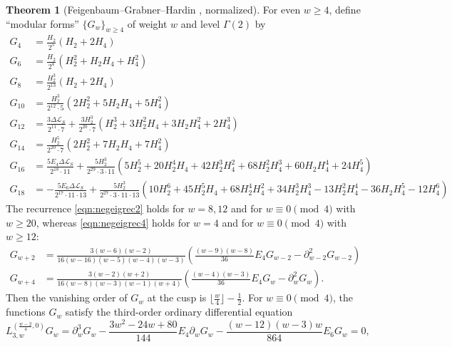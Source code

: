 \documentclass[10pt,reqno]{amsproc}
\newcommand{\cL}{\mathcal{L}}
\newcommand{\1}{\mathds{1}}	%
\theoremstyle{definition}
\newtheorem{theorem}{Theorem}[section]
\theoremstyle{remark}
\begin{document}
\begin{theorem}[Feigenbaum--Grabner--Hardin \cite{feigenbaum2021eigenfunctions}, normalized]
\label{thm:fghnegeig} 
For even $w \geq 4$, define ``modular forms'' $\{G_w\}_{w \geq 4}$ of weight $w$ and level $\Gamma(2)$ by
\begin{align*}
    G_{4} &= \frac{H_2}{2^5} (H_2 + 2H_4) \\
    G_{6} &= \frac{H_2}{2^4} (H_2^2 + H_2 H_4 + H_4^2) \\
    G_{8} &= \frac{H_{2}^{3}}{2^{13}}(H_{2} + 2H_{4})\\
    G_{10} &= \frac{H_{2}^{3}}{2^{12} \cdot 5}(2H_{2}^{2} + 5 H_{2} H_{4}+ 5H_{4}^{2}) \\
    G_{12} &= \frac{3 \Delta \cL_S}{2^{11} \cdot 7} + \frac{3H_{2}^{3}}{2^{20} \cdot 7}(H_{2}^{3} + 3 H_{2}^{2}H_{4} + 3H_{2} H_{4}^{2} + 2H_{4}^{3})\\
    G_{14} &= \frac{H_{2}^{5}}{2^{20} \cdot 7}(2H_{2}^{2} + 7H_{2} H_{4} + 7 H_{4}^{2})\\
    G_{16} &= \frac{5E_4 \Delta \cL_S}{2^{18} \cdot 11} + \frac{5H_{2}^{3}}{2^{29} \cdot 3 \cdot 11} (5 H_{2}^{5} + 20 H_{2}^{4} H_{4} + 42 H_{2}^{3}H_{4}^{2} + 68 H_{2}^{2} H_{4}^{3} + 60 H_{2} H_{4}^{4} + 24 H_{4}^{5}) \\
    G_{18} &= -\frac{5E_6 \Delta \cL_S}{2^{17} \cdot 11 \cdot 13}  +\frac{5H_{2}^{3}}{2^{27} \cdot 3 \cdot 11 \cdot 13} (10 H_{2}^{6} + 45 H_{2}^{5} H_{4} + 68  H_{2}^{4} H_{4}^{2} + 34 H_{2}^{3}H_{4}^{3} -13H_{2}^{2} H_{4}^{4}-36 H_{2}H_{4}^{5} -12 H_{4}^{6})
\end{align*}
The recurrence \eqref{eqn:negeigrec2} holds for $w=8,12$ and for $w \equiv 0 \pmod{4}$ with $w \geq 20$, whereas \eqref{eqn:negeigrec4} holds for $w=4$ and for $w \equiv 0 \pmod{4}$ with $w \geq 12$:
\begin{align}
    G_{w + 2} &= \frac{3(w-6)(w-2)}{16(w-16)(w-5)(w-4)(w-3)} \left(\frac{(w-9)(w-8)}{36}E_4 G_{w-2} - \partial_{w-2}^{2} G_{w-2} \right) \label{eqn:negeigrec2} \\
    G_{w + 4} &= \frac{3(w-2)(w+2)}{16(w-8)(w-3)(w-1)(w+4)} \left(\frac{(w-4)(w-3)}{36} E_4 G_{w} - \partial_{w}^{2} G_{w}\right). \label{eqn:negeigrec4}
\end{align}
Then the vanishing order of $G_{w}$ at the cusp is $\lfloor \frac{w}{4} \rfloor - \frac{1}{2}$.
For $w \equiv 0 \pmod{4}$, the functions $G_{w}$ satisfy the third-order ordinary differential equation
\begin{equation}
\label{eqn:negeigde}
L_{3,w}^{(\frac{w-2}{4},0)} G_w = \partial_{w}^3G_w - \frac{3w^2 - 24w + 80}{144}E_4 \partial_{w}G_{w} - \frac{(w-12)(w-3)w}{864}E_6 G_w = 0,

\end{equation}
\end{theorem}
\end{document}
